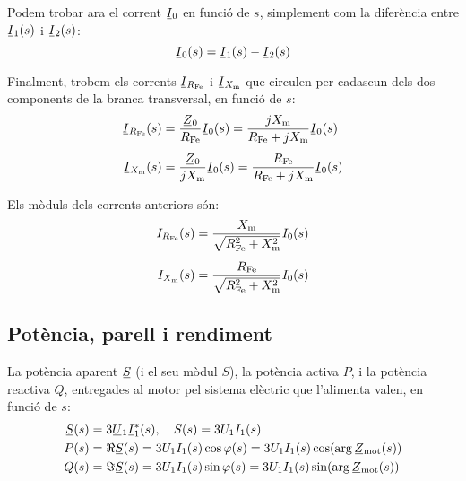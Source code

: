 Podem trobar ara el corrent $\cmplx{I}_0$ en funció de $s$, simplement com la diferència entre  $\cmplx{I}_1(s)$ i  $\cmplx{I}_2(s)$:
\begin{equation}
    \cmplx{I}_0(s) = \cmplx{I}_1(s) - \cmplx{I}_2(s)
\end{equation}

Finalment,  trobem els corrents $\cmplx{I}_{R\ped{Fe}}$ i $\cmplx{I}_{X\ped{m}}$ que circulen per cadascun dels dos components de la branca transversal, en funció de $s$:
\begin{subequations}
\begin{align}
    \cmplx{I}_{R\ped{Fe}}(s) &= \frac{\cmplx{Z}_0}{R\ped{Fe}} \cmplx{I}_0(s) = \frac{j X\ped{m}}{ R\ped{Fe} + j X\ped{m}}  \cmplx{I}_0(s) \\[1ex]
    \cmplx{I}_{X\ped{m}}(s) &= \frac{\cmplx{Z}_0}{j X\ped{m}} \cmplx{I}_0(s) = \frac{
    R\ped{Fe}}{ R\ped{Fe} + j X\ped{m}}  \cmplx{I}_0(s)
\end{align}
\end{subequations}

Els mòduls dels corrents anteriors són:
\begin{subequations}
\begin{align}
    I_{R_\mathrm{Fe}}(s) &=  \frac{X_\mathrm{m}}{\sqrt{R_\mathrm{Fe}^2 + X_\mathrm{m}^2}}  I_0(s) \\[1ex]
    I_{X_\mathrm{m}}(s) &=   \frac{R_\mathrm{Fe}}{\sqrt{R_\mathrm{Fe}^2 + X_\mathrm{m}^2}}  I_0(s)
\end{align}
\end{subequations}

\subsection{Potència, parell i rendiment}\label{sec:mot-p-t}

La potència aparent $\cmplx{S}$ (i el seu mòdul $S$), la potència activa  $P$, i la potència reactiva $Q$, entregades al motor pel sistema elèctric que l'alimenta valen, en funció de $s$:
\begin{subequations}\index{motors d'inducció!potència activa}\index{motors d'inducció!potència reactiva}\index{motors d'inducció!potència aparent}
\begin{align}
	\cmplx{S}(s)  &=  3 \cmplx{U}_1 \cmplx{I}_1^*(s), \quad S(s)  =  3 U_1 I_1(s)\label{eq:mot-S}\\
    P(s)  &=  \Re \cmplx{S}(s) = 3 U_1 I_1(s) \cos\varphi(s) = 3 U_1 I_1(s) \cos(\arg\cmplx{Z}\ped{mot}(s))\label{eq:mot-P}\\
    Q(s)  &=  \Im \cmplx{S}(s) = 3 U_1 I_1(s) \sin\varphi(s) = 3 U_1 I_1(s) \sin (\arg\cmplx{Z}\ped{mot}(s))\label{eq:mot-Q}
\end{align}
\end{subequations}

